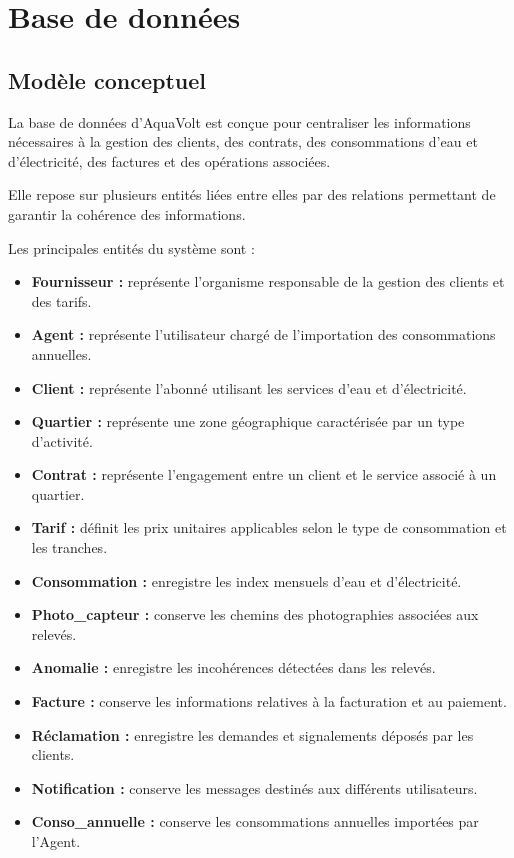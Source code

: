 
\chapter{Base de données}
\label{chap:basededonnees}

\section{Modèle conceptuel}

La base de données d'AquaVolt est conçue pour centraliser les informations nécessaires à la gestion des clients, des contrats, des consommations d'eau et d'électricité, des factures et des opérations associées.

Elle repose sur plusieurs entités liées entre elles par des relations permettant de garantir la cohérence des informations.

Les principales entités du système sont :

\begin{itemize}[leftmargin=*]
    \item \textbf{Fournisseur :} représente l'organisme responsable de la gestion des clients et des tarifs.
    \item \textbf{Agent :} représente l'utilisateur chargé de l'importation des consommations annuelles.
    \item \textbf{Client :} représente l'abonné utilisant les services d'eau et d'électricité.
    \item \textbf{Quartier :} représente une zone géographique caractérisée par un type d'activité.
    \item \textbf{Contrat :} représente l'engagement entre un client et le service associé à un quartier.
    \item \textbf{Tarif :} définit les prix unitaires applicables selon le type de consommation et les tranches.
    \item \textbf{Consommation :} enregistre les index mensuels d'eau et d'électricité.
    \item \textbf{Photo\_capteur :} conserve les chemins des photographies associées aux relevés.
    \item \textbf{Anomalie :} enregistre les incohérences détectées dans les relevés.
    \item \textbf{Facture :} conserve les informations relatives à la facturation et au paiement.
    \item \textbf{Réclamation :} enregistre les demandes et signalements déposés par les clients.
    \item \textbf{Notification :} conserve les messages destinés aux différents utilisateurs.
    \item \textbf{Conso\_annuelle :} conserve les consommations annuelles importées par l'Agent.
\end{itemize}

